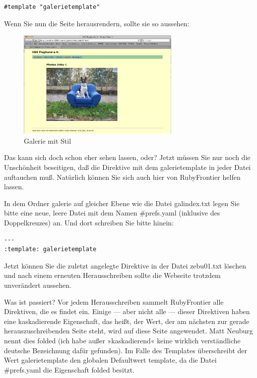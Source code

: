 \documentclass[11pt]{report}
\begin{document}
\begin{verbatim}
#template "galerietemplate"
\end{verbatim}

Wenn Sie nun die Seite herausrendern, sollte sie so aussehen:

\begin{figure}[h!]
\centering
\includegraphics[width=0.7\textwidth]{./images/galerie04.png}
\caption{\label{galerie04}Galerie mit Stil}
\end{figure}

Das kann sich doch schon eher sehen lassen, oder? Jetzt müssen Sie nur
noch die Unschönheit beseitigen, daß die Direktive mit dem
galerietemplate in jeder Datei auftauchen muß. Natürlich können Sie
sich auch hier von RubyFrontier helfen lassen.


In dem Ordner galerie auf gleicher Ebene wie die Datei galindex.txt
legen Sie bitte eine neue, leere Datei mit dem Namen \#prefs.yaml
(inklusive des Doppelkreuzes) an. Und dort schreiben Sie bitte hinein:


\begin{verbatim}
---
:template: galerietemplate
\end{verbatim}

Jetzt können Sie die zuletzt angelegte Direktive in der Datei
zebu01.txt löschen und nach einem erneuten Herausschreiben sollte die
Webseite trotzdem unverändert aussehen.


Was ist passiert? Vor jedem Herausschreiben sammelt RubyFrontier alle
Direktiven, die es findet ein. Einige — aber nicht alle — dieser
Direktiven haben eine kaskadierende Eigenschaft, das heißt, der Wert,
der am nächsten zur gerade herauszuschreibenden Seite steht, wird auf
diese Seite angewendet. Matt Neuburg nennt dies folded (ich habe außer
»kaskadierend« keine wirklich verständliche deutsche Bezeichnung dafür
gefunden). Im Falle des Templates überschreibt der Wert
galerietemplate den globalen Defaultwert template, da die
Datei \#prefs.yaml die Eigenschaft folded besitzt.
\end{document}
